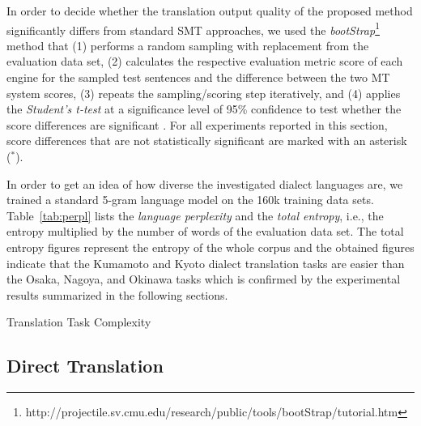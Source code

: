 \documentclass[english]{jnlp_1.4}
\begin{document}
 In order to decide whether the translation output quality of the proposed method significantly differs from standard SMT approaches,
 we used the {\em bootStrap}\footnote{http://projectile.sv.cmu.edu/research/public/tools/bootStrap/tutorial.htm}
 method that (1) performs a random sampling with replacement from the evaluation data set,
 (2) calculates the respective evaluation metric score of each engine for the sampled
 test sentences and the difference between the two MT system scores, (3) repeats  the sampling/scoring step
 iteratively, and (4) applies the {\em Student's t-test} at a significance level of 95\% confidence
 to test whether the score differences are significant \cite{Zhang04}. For all experiments reported in this section,
 score differences that are not statistically significant are marked with an asterisk (${}^{*}$).

 In order to get an idea of how diverse the investigated dialect languages are,
 we trained a standard 5-gram language model on the 160k training data sets.
 Table~\ref{tab:perpl} lists the {\em language perplexity} and the {\em total entropy}, i.e., the entropy multiplied
 by the number of words of the evaluation data set. The total entropy figures represent the entropy of the whole corpus
 and the obtained figures indicate that the Kumamoto and Kyoto dialect translation tasks are easier than the
 Osaka, Nagoya, and Okinawa tasks which is confirmed by the experimental results summarized
 in the following sections.

\begin{table}[t]
  \caption{Translation Task Complexity}
  \label{tab:perpl}

 \end{table}
 


\subsection{Direct Translation}
\label{sec:experiments:direct}
\end{document}
